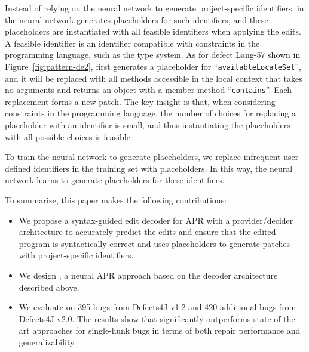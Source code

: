 Instead of relying on the neural network to generate project-specific identifiers, in \techname the neural network generates placeholders for such identifiers, and these placeholders are instantiated with all feasible identifiers when applying the edits. A feasible identifier is an identifier compatible with constraints in the programming language, such as the type system. As for defect Lang-57 shown in Figure~\ref{fig:pattern-de2}, \techname first generates a placeholder for ``{\tt availableLocaleSet}'', and it will be replaced with all methods accessible in the local context that takes no arguments and returns an object with a member method ``{\tt contains}''. Each replacement forms a new patch. The key insight is that, when considering constraints in the programming language, the number of choices for replacing a placeholder with an identifier is small, and thus instantiating the placeholders with all possible choices is feasible.

To train the neural network to generate placeholders, we replace infrequent user-defined identifiers in the training set with placeholders. In this way, the neural network learns to generate placeholders for these identifiers.

To summarize, this paper makes the following contributions:
\begin{itemize}
    \item We propose a syntax-guided edit decoder for APR with a provider/decider architecture to accurately predict the edits and ensure that the edited program is syntactically correct and uses placeholders to generate patches with project-specific identifiers.
    \item We design \techname, a neural APR approach based on the decoder architecture described above.
    \item We evaluate \techname on 395 bugs from Defects4J v1.2 and 420 additional bugs from Defects4J v2.0. The results show that \techname significantly outperforms state-of-the-art approaches for single-hunk bugs in terms of both repair performance and generalizability.
\end{itemize}
 

